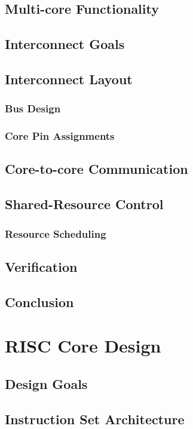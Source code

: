 \documentclass[11pt,a4paper]{report}
\begin{document}
{\section{Multi-core Functionality}
    \section{Interconnect Goals}
    \section{Interconnect Layout}
        \subsection{Bus Design}
        \subsection{Core Pin Assignments}
    \section{Core-to-core Communication}
    \section{Shared-Resource Control}
        \subsection{Resource Scheduling}
    \section{Verification}
    \section{Conclusion}

\chapter{RISC Core Design}
{\hypersetup{linkcolor=black}
\startcontents[chapters]
}
    \section{Design Goals}
    \section{Instruction Set Architecture}
}
\end{document}
